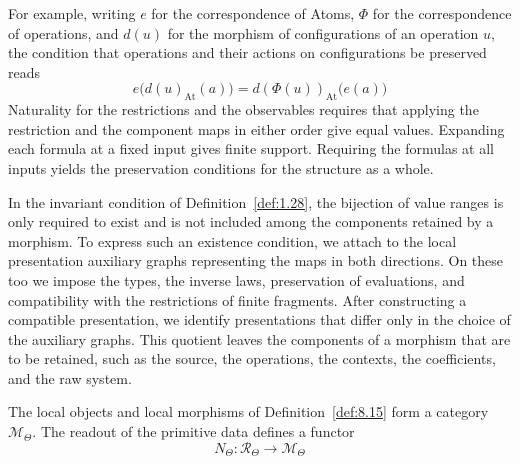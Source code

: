 \begin{definition}
For example, writing $e$ for the correspondence of Atoms, $\Phi$ for the correspondence of
operations, and $d(u)$ for the morphism of configurations of an operation $u$, the condition that operations and their actions on configurations be preserved reads
\begin{equation*}
e\bigl(d(u)_{\mathrm{At}}(a)\bigr)
=
d(\Phi(u))_{\mathrm{At}}\bigl(e(a)\bigr)
\tag{8.14}\label{eq:8.14}
\end{equation*}
Naturality for the restrictions and the observables requires that applying the restriction and
the component maps in either order give equal values.
Expanding each formula at a fixed input gives finite support.
Requiring the formulas at all inputs yields the preservation conditions for the structure as
a whole.

In the invariant condition of Definition~\ref{def:1.28}, the bijection of value ranges is only
required to exist and is not included among the components retained by a morphism.
To express such an existence condition, we attach to the local presentation auxiliary graphs
representing the maps in both directions.
On these too we impose the types, the inverse laws, preservation of evaluations, and
compatibility with the restrictions of finite fragments.
After constructing a compatible presentation, we identify presentations that differ only in
the choice of the auxiliary graphs.
This quotient leaves the components of a morphism that are to be retained, such as the source,
the operations, the contexts, the coefficients, and the raw system.

\end{definition}

\begin{lemma}\label{lem:8.16}

The local objects and local morphisms of Definition~\ref{def:8.15} form a category
$\mathcal{M}_\Theta$.
The readout of the primitive data defines a functor
\begin{equation*}
N_\Theta:\mathcal{R}_\Theta\longrightarrow\mathcal{M}_\Theta
\tag{8.15}\label{eq:8.15}
\end{equation*}

\end{lemma}

